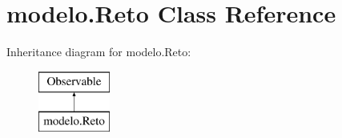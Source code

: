 \hypertarget{classmodelo_1_1_reto}{}\section{modelo.\+Reto Class Reference}
\label{classmodelo_1_1_reto}
Inheritance diagram for modelo.\+Reto\+:\begin{figure}[H]
\begin{center}
\leavevmode
\includegraphics[height=2.000000cm]{classmodelo_1_1_reto}
\end{center}
\end{figure}
